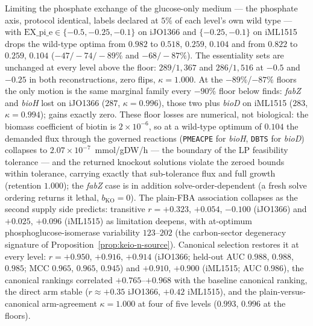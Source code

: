 \begin{proposition}
\label{prop:keio-phosphate}
Limiting the phosphate exchange of the glucose-only medium ---
the phosphate axis, protocol identical, labels declared at $5\%$ of
each level's own wild type --- with
$\mathrm{EX\_pi\_e}\in\{-0.5,-0.25,-0.1\}$ on iJO1366 and
$\{-0.25,-0.1\}$ on iML1515 drops the wild-type optima from $0.982$
to $0.518$, $0.259$, $0.104$ and from $0.822$ to $0.259$, $0.104$
($-47/-74/-89\%$ and $-68/-87\%$). The essentiality sets are
unchanged at every level above the floor: $289/1{,}367$ and
$286/1{,}516$ at $-0.5$ and $-0.25$ in both reconstructions, zero
flips, $\kappa=1.000$. At the $-89\%$/$-87\%$ floors the only
motion is the same marginal family every $-90\%$ floor below finds:
\emph{fabZ} and \emph{bioH} lost on iJO1366 ($287$,
$\kappa=0.996$), those two plus \emph{bioD} on iML1515 ($283$,
$\kappa=0.994$); gains exactly zero. These floor losses are
numerical, not biological: the biomass coefficient of biotin is
$2\times10^{-6}$, so at a wild-type optimum of $0.104$ the demanded
flux through the governed reactions (\texttt{PMEACPE} for
\emph{bioH}, \texttt{DBTS} for \emph{bioD}) collapses to
$2.07\times10^{-7}$~mmol/gDW/h --- the boundary of the LP
feasibility tolerance --- and the returned knockout solutions
violate the zeroed bounds within tolerance, carrying exactly that
sub-tolerance flux and full growth (retention $1.000$); the
\emph{fabZ} case is in addition solve-order-dependent (a fresh
solve ordering returns it lethal, $b_{\mathrm{KO}}=0$). The
plain-FBA association collapses as the second supply side
predicts: transitive $r=+0.323$, $+0.054$, $-0.100$ (iJO1366) and
$+0.025$, $+0.096$ (iML1515) as limitation deepens, with
at-optimum phosphoglucose-isomerase variability $123$--$202$ (the
carbon-sector degeneracy signature of
Proposition~\ref{prop:keio-n-source}). Canonical selection
restores it at every level: $r=+0.950$, $+0.916$, $+0.914$
(iJO1366; held-out AUC $0.988$, $0.988$, $0.985$; MCC $0.965$,
$0.965$, $0.945$) and $+0.910$, $+0.900$ (iML1515; AUC $0.986$),
the canonical rankings correlated $+0.765$--$+0.968$ with the
baseline canonical ranking, the direct arm stable ($r\approx+0.35$
iJO1366, $+0.42$ iML1515), and the plain-versus-canonical
arm-agreement $\kappa=1.000$ at four of five levels ($0.993$,
$0.996$ at the floors).
\end{proposition}

